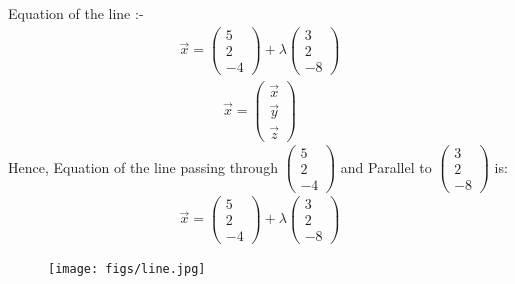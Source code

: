 \documentclass[journal]{IEEEtran}
\begin{document}
Equation of the line :-
\begin{align}
\vec{x} = \begin{pmatrix}5 \\2 \\-4\end{pmatrix} + \lambda \begin{pmatrix}3 \\2 \\-8\end{pmatrix}
\end{align}
\begin{align}
\vec{x}= \begin{pmatrix}\vec{x} \\\vec{y} \\\vec{z}\end{pmatrix}
\end{align}
Hence, Equation of the line passing through $\begin{pmatrix}5 \\2 \\-4\end{pmatrix}$ and Parallel to $\begin{pmatrix}3 \\2 \\-8\end{pmatrix}$ is:\\
\begin{align*}
\vec{x} = \begin{pmatrix}5 \\2 \\-4\end{pmatrix} + \lambda \begin{pmatrix}3 \\2 \\-8\end{pmatrix}
\end{align*}

\begin{figure}[H]
    \centering
    \texttt{[image: figs/line.jpg]}
    \caption{}
    \label{fig:LINE}
\end{figure}
\end{document}
